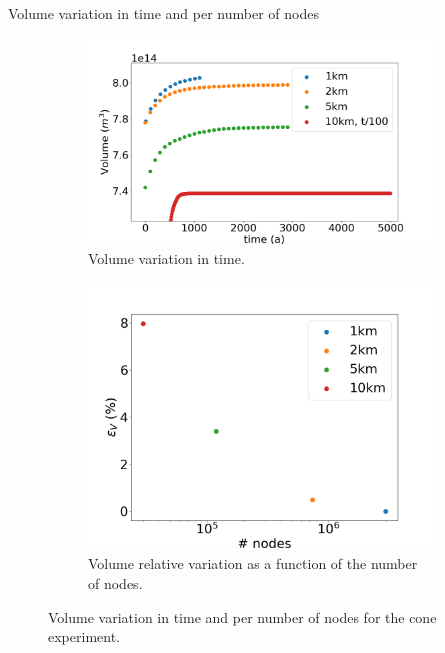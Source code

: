 \documentclass[11pt]{beamer}
\begin{document}
		\begin{frame}{Volume variation in time and per number of nodes}
		\begin{figure}
			\centering
			\begin{subfigure}{.5\textwidth}
				\centering
				\includegraphics[width=1.1\linewidth]{../fig/Volume_CONE_full_all_res_vs_time.png}
				\caption{Volume variation in time.}
				\label{VOLUME_CONE_VS_TIME}
			\end{subfigure}%
			\begin{subfigure}{.5\textwidth}
				\centering
				\includegraphics[width=1.1\linewidth]{../fig/Volume_CONE_full_all_res_vs_num_nodes.png}
				\caption{Volume relative variation as a function of the number of nodes.}
				\label{H_CONE_VS_NODES}
			\end{subfigure}%
			\caption{Volume variation in time and per number of nodes for the cone experiment.}
			\label{Volume_CONE_VS_TIME_VS_NODES}
		\end{figure}
		\end{frame}
\end{document}
